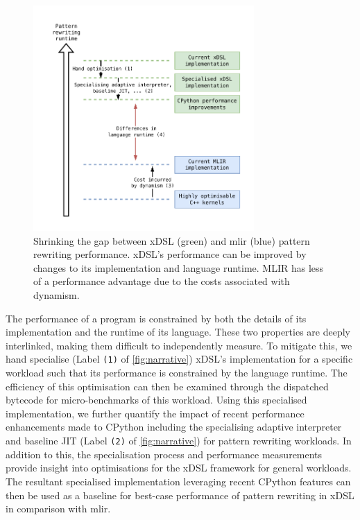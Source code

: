 \begin{figure}[H]
    \centering
    \includegraphics[width=0.75\textwidth]{images/11_introduction/narrative.drawio.pdf}
    \caption{Shrinking the gap between xDSL (green) and \ac{mlir} (blue) pattern rewriting performance. xDSL's performance can be improved by changes to its implementation and language runtime. MLIR has less of a performance advantage due to the costs associated with dynamism.} %
    \label{fig:narrative}
\end{figure}

The performance of a program is constrained by both the details of its implementation and the runtime of its language.
These two properties are deeply interlinked, making them difficult to independently measure. To mitigate this, we hand specialise (Label \texttt{(1)} of \autoref{fig:narrative}) xDSL's implementation for a specific workload such that its performance is constrained by the language runtime. The efficiency of this optimisation can then be examined through the dispatched bytecode for micro-benchmarks of this workload. Using this specialised implementation, we further quantify the impact of recent performance enhancements made to CPython including the specialising adaptive interpreter and baseline JIT (Label \texttt{(2)} of \autoref{fig:narrative}) for pattern rewriting workloads. In addition to this, the specialisation process and performance measurements provide insight into optimisations for the xDSL framework for general workloads.
The resultant specialised implementation leveraging recent CPython features can then be used as a baseline for best-case performance of pattern rewriting in xDSL in comparison with \ac{mlir}.


